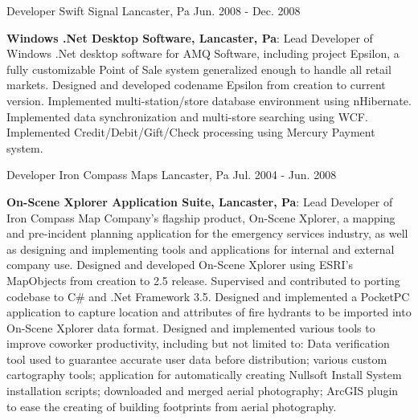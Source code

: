 \begin{cventries}
{\begin{cvitems}
      \end{cvitems}
    }
  \cventry
    {Developer}
    {Swift Signal}
    {Lancaster,  Pa}
    {Jun. 2008 - Dec. 2008}
    {
      \begin{cvitems}
        \item {\textbf{Windows .Net Desktop Software, Lancaster, Pa}: Lead Developer of Windows .Net desktop software for AMQ Software, including project Epsilon, a fully customizable Point of Sale system generalized enough to handle all retail markets. Designed and developed codename Epsilon from creation to current version. Implemented multi-station/store database environment using nHibernate. Implemented data synchronization and multi-store searching using WCF. Implemented Credit/Debit/Gift/Check processing using Mercury Payment system.}
      \end{cvitems}
    }
  \cventry
    {Developer}
    {Iron Compass Maps}
    {Lancaster, Pa}
    {Jul. 2004 - Jun. 2008}
    {
      \begin{cvitems}
        \item {\textbf{On-Scene Xplorer Application Suite, Lancaster, Pa}: Lead Developer of Iron Compass Map Company’s flagship product, On-Scene Xplorer, a mapping and pre-incident planning application for the emergency services industry, as well as designing and implementing tools and applications for internal and external company use. Designed and developed On-Scene Xplorer using ESRI’s MapObjects from creation to 2.5 release. Supervised and contributed to porting codebase to C\# and .Net Framework 3.5. Designed and implemented a PocketPC application to capture location and attributes of fire hydrants to be imported into On-Scene Xplorer data format. Designed and implemented various tools to improve coworker productivity, including but not limited to: Data verification tool used to guarantee accurate user data before distribution; various custom cartography tools; application for automatically creating Nullsoft Install System installation scripts; downloaded and merged aerial photography; ArcGIS plugin to ease the creating of building footprints from aerial photography.}
      \end{cvitems}
    }
\end{cventries}
